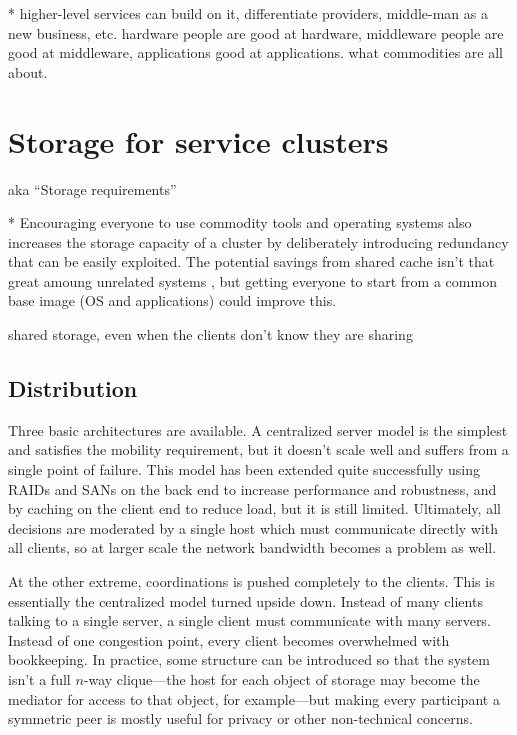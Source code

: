 * higher-level services can build on it, differentiate providers, middle-man as a new business, etc. hardware people are good at hardware, middleware people are good at middleware, applications good at applications. what commodities are all about.

\section{Storage for service clusters}

aka ``Storage requirements''

* Encouraging everyone to use commodity tools and operating systems also increases the storage capacity of a cluster by deliberately introducing redundancy that can be easily exploited. The potential savings from shared cache isn't that great amoung unrelated systems \cite{muntz}, but getting everyone to start from a common base image (OS and applications) could improve this.

shared storage, even when the clients don't know they are sharing

\subsection{Distribution}

Three basic architectures are available. A centralized server model is the simplest and satisfies the mobility requirement, but it doesn't scale well and suffers from a single point of failure. This model has been extended quite successfully using RAIDs and SANs on the back end to increase performance and robustness, and by caching on the client end to reduce load, but it is still limited. Ultimately, all decisions are moderated by a single host which must communicate directly with all clients, so at larger scale the network bandwidth becomes a problem as well.

At the other extreme, coordinations is pushed completely to the clients. This is essentially the centralized model turned upside down. Instead of many clients talking to a single server, a single client must communicate with many servers. Instead of one congestion point, every client becomes overwhelmed with bookkeeping. In practice, some structure can be introduced so that the system isn't a full $n$-way clique---the host for each object of storage may become the mediator for access to that object, for example---but making every participant a symmetric peer is mostly useful for privacy or other non-technical concerns.

